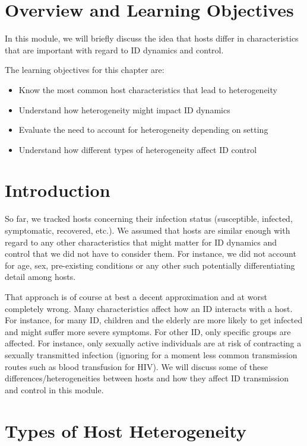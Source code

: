 \documentclass[]{book}
\providecommand{\tightlist}{%
  \setlength{\itemsep}{0pt}\setlength{\parskip}{0pt}}
\theoremstyle{definition}
\theoremstyle{definition}
\theoremstyle{definition}
\theoremstyle{remark}
\begin{document}
\section{Overview and Learning
Objectives}\label{overview-and-learning-objectives-10}

In this module, we will briefly discuss the idea that hosts differ in
characteristics that are important with regard to ID dynamics and
control.

The learning objectives for this chapter are:

\begin{itemize}
\tightlist
\item
  Know the most common host characteristics that lead to heterogeneity
\item
  Understand how heterogeneity might impact ID dynamics
\item
  Evaluate the need to account for heterogeneity depending on setting
\item
  Understand how different types of heterogeneity affect ID control
\end{itemize}

\section{Introduction}\label{introduction-10}

So far, we tracked hosts concerning their infection status (susceptible,
infected, symptomatic, recovered, etc.). We assumed that hosts are
similar enough with regard to any other characteristics that might
matter for ID dynamics and control that we did not have to consider
them. For instance, we did not account for age, sex, pre-existing
conditions or any other such potentially differentiating detail among
hosts.

That approach is of course at best a decent approximation and at worst
completely wrong. Many characteristics affect how an ID interacts with a
host. For instance, for many ID, children and the elderly are more
likely to get infected and might suffer more severe symptoms. For other
ID, only specific groups are affected. For instance, only sexually
active individuals are at risk of contracting a sexually transmitted
infection (ignoring for a moment less common transmission routes such as
blood transfusion for HIV). We will discuss some of these
differences/heterogeneities between hosts and how they affect ID
transmission and control in this module.

\section{Types of Host Heterogeneity}\label{types-of-host-heterogeneity}
\end{document}
